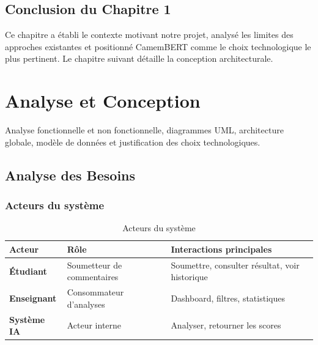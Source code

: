 \documentclass[12pt,a4paper,oneside]{report}
\begin{document}
\section*{Conclusion du Chapitre 1}
Ce chapitre a établi le contexte motivant notre projet, analysé les limites
des approches existantes et positionné CamemBERT comme le choix technologique
le plus pertinent. Le chapitre suivant détaille la conception architecturale.
\cleardoublepage

\chapter{Analyse et Conception}

\begin{infobox}
Analyse fonctionnelle et non fonctionnelle, diagrammes UML, architecture
globale, modèle de données et justification des choix technologiques.
\end{infobox}

\section{Analyse des Besoins}

\subsection{Acteurs du système}

\begin{table}[H]
\centering
\caption{Acteurs du système}
\label{tab:acteurs}
\renewcommand{\arraystretch}{1.4}
\begin{tabular}{>{\bfseries}p{2.8cm} p{4.5cm} p{5.5cm}}
\toprule
\rowcolor{bleuprincipal!15}
\textbf{Acteur} & \textbf{Rôle} & \textbf{Interactions principales} \\
\midrule
Étudiant & Soumetteur de commentaires & Soumettre, consulter résultat, voir historique \\
\rowcolor{gray!8}
Enseignant & Consommateur d'analyses & Dashboard, filtres, statistiques \\
Système IA & Acteur interne & Analyser, retourner les scores \\
\bottomrule
\end{tabular}
\end{table}
\end{document}
